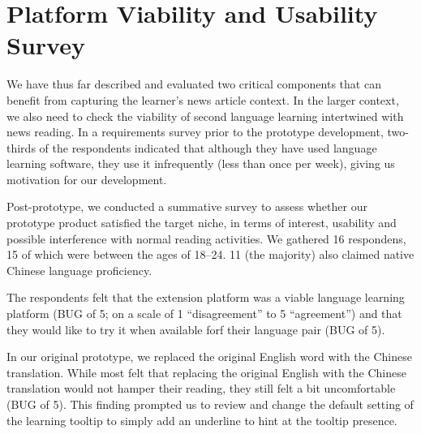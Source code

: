 \section{Platform Viability and Usability Survey}

We have thus far described and evaluated two critical components that
can benefit from capturing the learner's news article context.  In the
larger context, we also need to check the viability of second language
learning intertwined with news reading.  In a requirements survey
prior to the prototype development, two-thirds of the respondents
indicated that although they have used language learning software,
they use it infrequently (less than once per week), giving us motivation for our development.  

Post-prototype, we conducted a summative survey to assess whether our
prototype product satisfied the target niche, in terms of interest,
usability and possible interference with normal reading activities.
We gathered 16 respondens, 15 of which were between the ages of
18--24.  11 (the majority) also claimed native Chinese language
proficiency.  

The respondents felt that the extension platform was a viable language
learning platform (BUG of 5; on a scale of 1 ``disagreement'' to 
5 ``agreement'') and that they would like to try it when available
forf their language pair (BUG of 5).

In our original prototype, we replaced the original English word with
the Chinese translation.  While most felt that replacing the original
English with the Chinese translation would not hamper their reading,
they still felt a bit uncomfortable (BUG of 5).  This finding
prompted us to review and change the default setting of the learning
tooltip to simply add an underline to hint at the tooltip presence.




